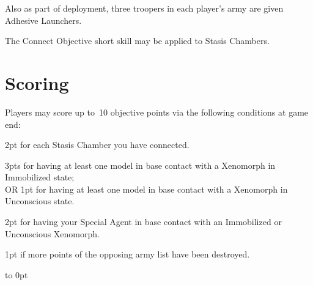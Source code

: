 \medskip%
Also as part of deployment, three troopers in each player's army are
given Adhesive Launchers.

The Connect Objective short skill may be applied to Stasis Chambers.

\vspace{-2pt}
\section{Scoring}

Players may score up to~10 objective points via the following
conditions at game end:
\begin{squishitemize}
\item 2pt for each Stasis Chamber you have connected.
\item 3pts for having at least one model in base contact with a
  Xenomorph in Immobilized state;\\
  OR 1pt for having at least one model in base contact with a
  Xenomorph in Unconscious state.
\item 2pt for having your Special Agent in base contact with an
  Immobilized or Unconscious 
  Xenomorph.

\item 1pt if more points of the opposing army list have been destroyed.
\end{squishitemize}

\vfill
\vbox to 0pt{}